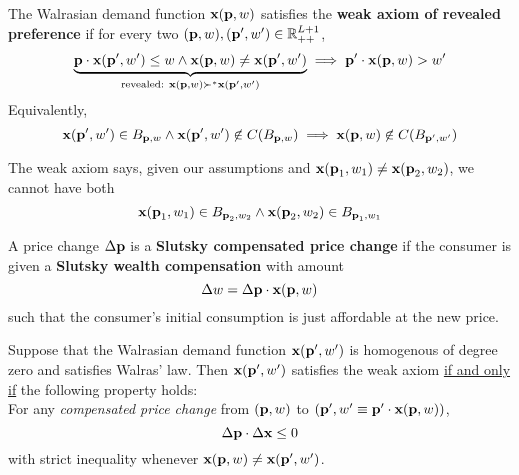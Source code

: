 \documentclass{article}
\begin{document}
 			\begin{definition}
 				The Walrasian demand function $\textbf{x}(\textbf{p}, w)$ satisfies the \textbf{weak axiom of revealed preference} if for every two $(\textbf{p}, w), (\textbf{p}', w') \in \mathbb{R}_{++}^{L+1}$,
 				\begin{gather}
 					\underbrace{\textbf{p} \cdot \textbf{x}(\textbf{p}', w') \leq w
 					\land \textbf{x}(\textbf{p}, w) \neq \textbf{x}(\textbf{p}', w')}_{\text{{revealed: }} \textbf{x}(\textbf{p}, w) \succ^* \textbf{x}(\textbf{p}', w')}
 					\implies \textbf{p}' \cdot \textbf{x}(\textbf{p}, w) > w'
 				\end{gather}
 				Equivalently,
 				\begin{equation}
 					\ve{x}(\ve{p}', w') \in B_{\ve{p}, w} \land \ve{x}(\ve{p}', w') \centernot \in C(B_{\ve{p}, w}) \implies \ve{x}(\ve{p}, w) \centernot \in C(B_{\ve{p}', w'})
 				\end{equation}
 			\end{definition}
 			
 			\begin{corollary}
 				The weak axiom says, given our assumptions and $\textbf{x}(\textbf{p}_1, w_1) \neq \textbf{x}(\textbf{p}_2, w_2)$, we cannot have both 
 				\begin{equation}
 					\textbf{x}(\textbf{p}_1, w_1) \in B_{\textbf{p}_2, w_2} \land \textbf{x}(\textbf{p}_2, w_2) \in B_{\textbf{p}_1, w_1}
 				\end{equation}
 			\end{corollary}
 			
 			\begin{definition}
 				A price change $\Delta \textbf{p}$ is a \textbf{Slutsky compensated price change} if the consumer is given a \textbf{Slutsky wealth compensation} with amount
 				\begin{equation}
 					\Delta w = \Delta \textbf{p} \cdot \textbf{x}(\textbf{p}, w)
 				\end{equation}
 				such that the consumer's initial consumption is just affordable at the new price.
 			\end{definition}
 			
 			\begin{proposition}[2.F.1]
 				Suppose that the Walrasian demand function $\textbf{x}(\textbf{p}', w')$ is homogenous of degree zero and satisfies Walras' law. Then $\textbf{x}(\textbf{p}', w')$ satisfies the weak axiom \ul{if and only if} the following property holds: \\
 				For any \emph{compensated price change} from $(\textbf{p}, w)$ to $(\textbf{p}', w'\equiv \textbf{p}' \cdot \textbf{x}(\textbf{p}, w))$,
 				\begin{equation}
 					\Delta \textbf{p} \cdot \Delta \textbf{x} \leq 0
 				\end{equation}
 				with strict inequality whenever $\textbf{x}(\textbf{p}, w) \neq \textbf{x}(\textbf{p}', w')$.
 			\end{proposition}
 			
\end{document}
